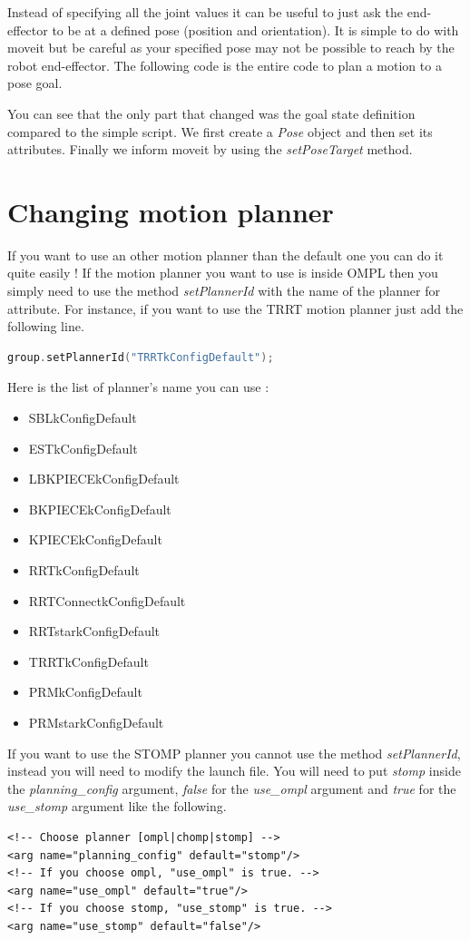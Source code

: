 Instead of specifying all the joint values it can be useful to just ask the end-effector to be at a defined pose (position and orientation). It is simple to do with moveit but be careful as your specified pose may not be possible to reach by the robot end-effector. The following code is the entire code to plan a motion to a pose goal.



You can see that the only part that changed was the goal state definition compared to the simple script. We first create a \emph{Pose} object and then set its attributes. Finally we inform moveit by using the \emph{setPoseTarget} method.


\section{Changing motion planner}

If you want to use an other motion planner than the default one you can do it quite easily ! If the motion planner you want to use is inside OMPL then you simply need to use the method \emph{setPlannerId} with the name of the planner for attribute. For instance, if you want to use the TRRT motion planner just add the following line.


\begin{lstlisting}[language=c++]
group.setPlannerId("TRRTkConfigDefault");
\end{lstlisting}

Here is the list of planner's name you can use :
\begin{itemize}
\item SBLkConfigDefault
\item ESTkConfigDefault
\item LBKPIECEkConfigDefault
\item BKPIECEkConfigDefault
\item KPIECEkConfigDefault
\item RRTkConfigDefault
\item RRTConnectkConfigDefault
\item RRTstarkConfigDefault
\item TRRTkConfigDefault
\item PRMkConfigDefault
\item PRMstarkConfigDefault
\end{itemize}

If you want to use the STOMP planner you cannot use the method \emph{setPlannerId}, instead you will need to modify the launch file. You will need to put \emph{stomp} inside the \emph{planning\_config} argument, \emph{false} for the \emph{use\_ompl} argument and \emph{true} for the \emph{use\_stomp} argument like the following. 



\begin{lstlisting}
<!-- Choose planner [ompl|chomp|stomp] -->
<arg name="planning_config" default="stomp"/>
<!-- If you choose ompl, "use_ompl" is true. -->
<arg name="use_ompl" default="true"/>
<!-- If you choose stomp, "use_stomp" is true. -->
<arg name="use_stomp" default="false"/>
\end{lstlisting}